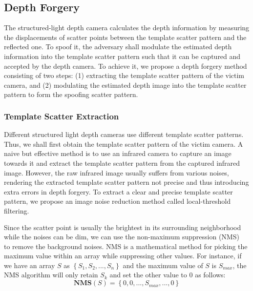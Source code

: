 \subsection{Depth Forgery}
The structured-light depth camera calculates the depth information by measuring the displacements of scatter points between the template scatter pattern and the reflected one.  To spoof it, the adversary shall modulate the estimated depth information into the template scatter pattern such that it can be captured and accepted by the depth camera.  
To achieve it, we propose a depth forgery method consisting of two steps: (1) extracting the template scatter pattern of the victim camera, and (2) modulating the estimated depth image into the template scatter pattern to form the spoofing scatter pattern. 

\subsubsection{Template Scatter Extraction}
Different structured light depth cameras use different template scatter patterns. Thus, we shall first obtain the template scatter pattern of the victim camera. 
A naive but effective method is to use an infrared camera to capture an image towards it and extract the template scatter pattern from the captured infrared image. However, the raw infrared image usually suffers from various noises, rendering the extracted template scatter pattern not precise and thus  introducing extra errors in depth forgery. To extract a clear and precise template scatter pattern, we propose an image noise reduction method called local-threshold filtering. 

Since the scatter point is usually the brightest in its surrounding neighborhood while the noises can be dim, we can use the non-maximum suppression (NMS)~\cite{girshick2014rich} to remove the background noises. NMS is a mathematical method for picking the maximum value within an array while suppressing other values. For instance, if we have an array $S$ as $\left \{S_1, S_2, ...,S_n \right \}$ and the maximum value of $S$ is $S_{max}$, the NMS algorithm will only retain $S_k$ and set the other value to 0 as follows:
\begin{equation}
	\textbf{NMS}(S)=\left \{0, 0, ..., S_{max},...,0 \right \}\label{nms_1}
\end{equation}

